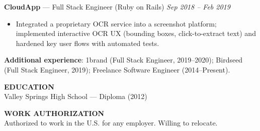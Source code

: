 \documentclass[10pt]{article}
\begin{document}
\textbf{CloudApp} --- Full Stack Engineer (Ruby on Rails) \hfill \textit{Sep 2018 -- Feb 2019}\\
\vspace{-6pt}
\begin{itemize}
  \setlength\itemsep{-2pt}
  \setlength\parskip{0pt}
  \setlength\parsep{0pt}
  \item Integrated a proprietary OCR service into a screenshot platform; implemented interactive OCR UX (bounding boxes, click-to-extract text) and hardened key user flows with automated tests.
\end{itemize}

\textbf{Additional experience}: 1brand (Full Stack Engineer, 2019--2020); Birdseed (Full Stack Engineer, 2019); Freelance Software Engineer (2014--Present).

\vspace{4pt}
\textbf{EDUCATION}\\
Valley Springs High School --- Diploma (2012)

\vspace{2pt}
\textbf{WORK AUTHORIZATION}\\
Authorized to work in the U.S. for any employer. Willing to relocate.
\end{document}

